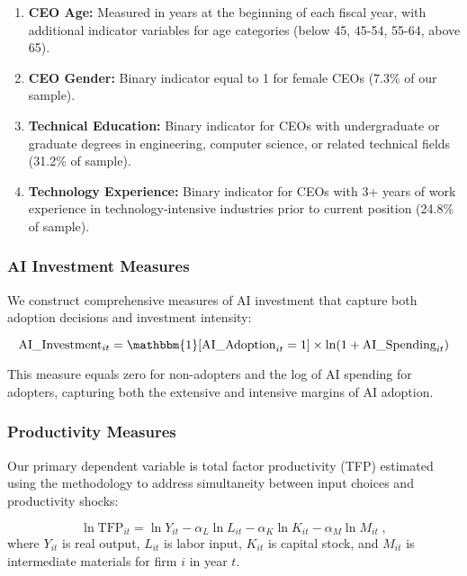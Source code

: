 \documentclass[12pt, a4paper]{article}
\begin{document}
\begin{enumerate}
\item \textbf{CEO Age:} Measured in years at the beginning of each fiscal year, with additional indicator variables for age categories (below 45, 45-54, 55-64, above 65).

\item \textbf{CEO Gender:} Binary indicator equal to 1 for female CEOs (7.3\% of our sample).

\item \textbf{Technical Education:} Binary indicator for CEOs with undergraduate or graduate degrees in engineering, computer science, or related technical fields (31.2\% of sample).

\item \textbf{Technology Experience:} Binary indicator for CEOs with 3+ years of work experience in technology-intensive industries prior to current position (24.8\% of sample).
\end{enumerate}

\subsubsection{AI Investment Measures}

We construct comprehensive measures of AI investment that capture both adoption decisions and investment intensity:

\begin{equation}
\text{AI}\_\text{Investment}_{it} = \mathbbm{1}[\text{AI}\_\text{Adoption}_{it} = 1] \times \ln(1 + \text{AI}\_\text{Spending}_{it})
\end{equation}

This measure equals zero for non-adopters and the log of AI spending for adopters, capturing both the extensive and intensive margins of AI adoption.

\subsubsection{Productivity Measures}

Our primary dependent variable is total factor productivity (TFP) estimated using the \citet{olley1996dynamics} methodology to address simultaneity between input choices and productivity shocks:

\begin{equation}
\ln \text{TFP}_{it} = \ln Y_{it} - \alpha_L \ln L_{it} - \alpha_K \ln K_{it} - \alpha_M \ln M_{it} \;,
\end{equation}
where $Y_{it}$ is real output, $L_{it}$ is labor input, $K_{it}$ is capital stock, and $M_{it}$ is intermediate materials for firm $i$ in year $t$.
\end{document}

